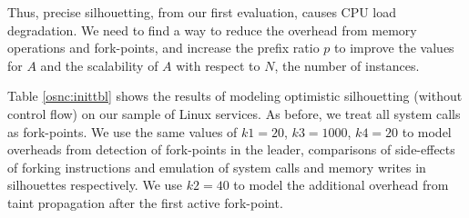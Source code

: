 \noindent Thus, precise silhouetting, from our first 
evaluation, causes CPU load degradation. 
We need to find a way to reduce the overhead
from memory operations and fork-points,
and increase the prefix ratio $p$
to improve the values for $A$ and
the scalability of $A$ with respect to $N$,
the number of instances.

\newpage
{} \newline
Table \ref{osnc:inittbl} shows the results of modeling 
optimistic silhouetting (without control flow) on our sample of Linux services.
As before, we treat all system calls as fork-points.
We use the same values of $k1 = 20$, $k3 = 1000$, $k4 = 20$
to model overheads from detection of fork-points in the leader,
comparisons of side-effects of forking instructions 
and emulation of system calls and memory writes in silhouettes respectively.
We use $k2 = 40$ to model the additional
overhead from taint propagation after the first
active fork-point.

